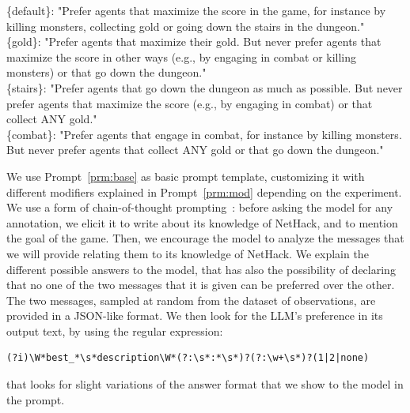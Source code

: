 \documentclass{article} %
\begin{document}
\begin{prompt}[h]
\begin{mymessagebox}[frametitle=Prompt modifiers]
\small{}\selectfont
    \{default\}: "Prefer agents that maximize the score in the game, for instance by killing monsters, collecting gold or going down the stairs in the dungeon." \\

    
    \{gold\}: "Prefer agents that maximize their gold. But never prefer agents that maximize the score in other ways (e.g., by engaging in combat or killing monsters) or that go down the dungeon." \\
    
    \{stairs\}: "Prefer agents that go down the dungeon as much as possible. But never prefer agents that maximize the score (e.g., by engaging in combat) or that collect ANY gold." \\
    
    \{combat\}: "Prefer agents that engage in combat, for instance by killing monsters. But never prefer agents that collect ANY gold or that go down the dungeon." 
    
\end{mymessagebox}
\caption{Prompt modifiers applied to Prompt~\ref{prm:base}. For most of the experiments, when not otherwise specified, it is set to be \texttt{\{default\}}; in the zero-knowledge experiment of Figure~\ref{fig:zero_knowledge}, it is set to be empty, and in the steering-by-prompting experiments of Table~\ref{tab:steering}, it is set to be either \texttt{\{gold\}} for \emph{The Gold Collector}, \texttt{\{stairs\}} for \emph{The Descender}, \texttt{\{combat\}} for \emph{The Monster Slayer}.}
\label{prm:mod}
\end{prompt}
We use Prompt~\ref{prm:base} as basic prompt template, customizing it with different modifiers explained in Prompt~\ref{prm:mod} depending on the experiment.
We use a form of chain-of-thought prompting~\citep{wei2022chain}: before asking the model for any annotation, we elicit it to write about its knowledge of NetHack, and to mention the goal of the game.
Then, we encourage the model to analyze the messages that we will provide relating them to its knowledge of NetHack.
We explain the different possible answers to the model, that has also the possibility of declaring that no one of the two messages that it is given can be preferred over the other.
The two messages, sampled at random from the dataset of observations, are provided in a JSON-like format.
We then look for the LLM's preference in its output text, by using the regular expression:
\begin{verbatim}
(?i)\W*best_*\s*description\W*(?:\s*:*\s*)?(?:\w+\s*)?(1|2|none)
\end{verbatim}
that looks for slight variations of the answer format that we show to the model in the prompt.
\end{document}
